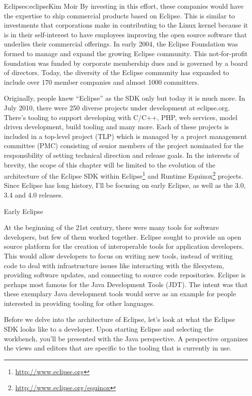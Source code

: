 \begin{aosachapter}{Eclipse}{s:eclipse}{Kim Moir}
By investing in this effort, these companies would have the expertise
to ship commercial products based on Eclipse. This is similar to
investments that corporations make in contributing to the Linux kernel
because it is in their self-interest to have employees improving the
open source software that underlies their commercial offerings. In
early 2004, the Eclipse Foundation was formed to manage and expand the
growing Eclipse community.  This not-for-profit foundation was funded
by corporate membership dues and is governed by a board of
directors. Today, the diversity of the Eclipse community has expanded
to include over 170 member companies and almost 1000 committers.

Originally, people knew ``Eclipse'' as the SDK only but today it is
much more.  In July 2010, there were 250 diverse projects under
development at eclipse.org. There's tooling to support developing with
C/C++, PHP, web services, model driven development, build tooling and
many more. Each of these projects is included in a top-level project
(TLP) which is managed by a project management committee (PMC)
consisting of senior members of the project nominated for the
responsibility of setting technical direction and release goals. In
the interests of brevity, the scope of this chapter will be limited to
the evolution of the architecture of the Eclipse SDK within 
Eclipse\footnote{\url{http://www.eclipse.org}} and Runtime 
Equinox\footnote{\url{http://www.eclipse.org/equinox}} projects. Since Eclipse has
long history, I'll be focusing on early Eclipse, as well as the 3.0,
3.4 and 4.0 releases.

\begin{aosasect1}{Early Eclipse}

At the beginning of the 21st century, there were many tools for
software developers, but few of them worked together. Eclipse sought
to provide an open source platform for the creation of interoperable
tools for application developers. This would allow
developers to focus on writing new tools, instead of
writing code to deal with infrastructure issues like interacting
with the filesystem, providing software updates, and connecting to
source code repositories. Eclipse is perhaps most famous for the Java
Development Tools (JDT). The intent was that these exemplary Java
development tools would serve as an example for people interested in
providing tooling for other languages.

Before we delve into the architecture of Eclipse, let's look at what
the Eclipse SDK looks like to a developer.  Upon starting Eclipse and
selecting the workbench, you'll be presented with the Java
perspective. A perspective organizes the views and editors that are
specific to the tooling that is currently in use.


\end{aosasect1}
\end{aosachapter}
